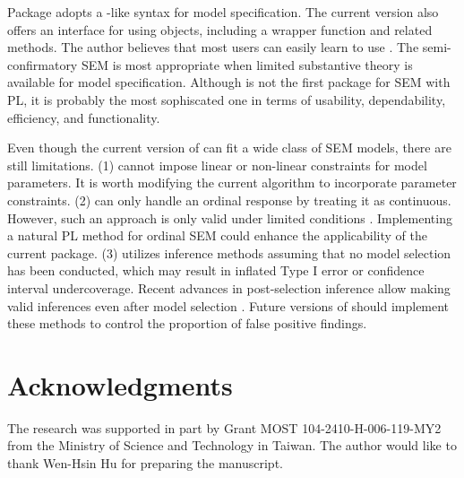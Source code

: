 \documentclass[nojss]{jss}
\begin{document}
Package  adopts a -like syntax for model specification. The current version also offers an  interface for using  objects, including a wrapper function  and related  methods. The author believes that most  users can easily learn to use . The semi-confirmatory SEM is most appropriate when limited substantive theory is available for model specification. Although  is not the first package for SEM with PL, it is probably the most sophiscated one in terms of usability, dependability, efficiency, and functionality.

Even though the current version of  can fit a wide class of SEM models, there are still limitations. (1)  cannot impose linear or non-linear constraints for model parameters. It is worth modifying the current algorithm to incorporate parameter constraints. (2)  can only handle an ordinal response by treating it as continuous. However, such an approach is only valid under limited conditions \citep[e.g.,][]{Rhemtulla2012}. Implementing a natural PL method for ordinal SEM could enhance the applicability of the current package. (3)  utilizes inference methods assuming that no model selection has been conducted, which may result in inflated Type I error or confidence interval undercoverage. Recent advances in post-selection inference allow making valid inferences even after model selection \citep[e.g.,][]{berk2013, Lee2016}. Future versions of  should implement these methods to control the proportion of false positive findings.

\section*{Acknowledgments}
The research was supported in part by Grant MOST 104-2410-H-006-119-MY2 from the Ministry of Science and Technology in Taiwan. The author would like to thank Wen-Hsin Hu for preparing the manuscript.





\newpage
\end{document}
